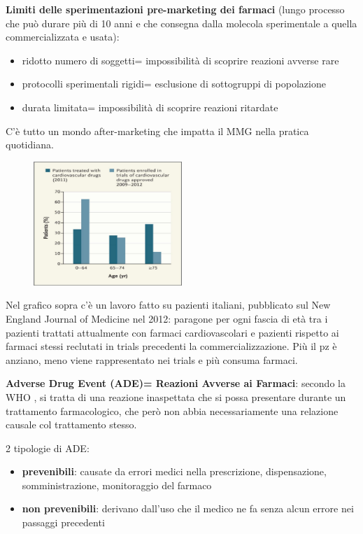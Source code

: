   \textbf{Limiti delle sperimentazioni pre-marketing dei farmaci} (lungo
  processo che può durare più di 10 anni e che consegna dalla molecola
  sperimentale a quella commercializzata e usata):

\begin{itemize}
\item
  ridotto numero di soggetti= impossibilità di scoprire reazioni avverse
  rare
\item
  protocolli sperimentali rigidi= esclusione di sottogruppi di
  popolazione
\item
  durata limitata= impossibilità di scoprire reazioni ritardate
\end{itemize}

  C'è tutto un mondo after-marketing che impatta il MMG nella pratica
  quotidiana.

\begin{figure}[!ht]
\centering
	\includegraphics[width=0.5\textwidth]{37/image1.jpg}
	\end{figure}

  Nel grafico sopra c'è un lavoro fatto su pazienti italiani, pubblicato
  sul New England Journal of Medicine nel 2012: paragone per ogni fascia
  di età tra i pazienti trattati attualmente con farmaci cardiovascolari
  e pazienti rispetto ai farmaci stessi reclutati in trials precedenti
  la commercializzazione. Più il pz è anziano, meno viene rappresentato
  nei trials e più consuma farmaci.

  \textbf{Adverse Drug Event (ADE)= Reazioni Avverse ai Farmaci}:
  secondo la WHO , si tratta di una reazione inaspettata che si possa
  presentare durante un trattamento farmacologico, che però non abbia
  necessariamente una relazione causale col trattamento stesso.

  2 tipologie di ADE:

\begin{itemize}
\item
  \textbf{prevenibili}: causate da errori medici nella prescrizione,
  dispensazione, somministrazione, monitoraggio del farmaco
\item
  \textbf{non prevenibili}: derivano dall'uso che il medico ne fa senza
  alcun errore nei passaggi precedenti
\end{itemize}

